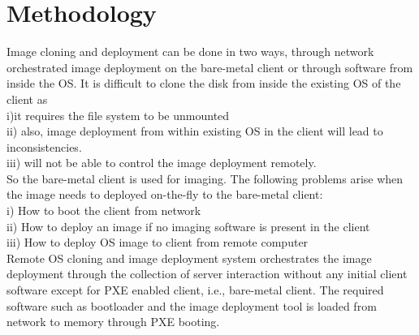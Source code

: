 \documentclass[a4paper,12pt]{article}
\begin{document}


\newpage

\section{\fontsize{16pt}{1em} Methodology}
Image cloning and deployment can be done in two ways, through network orchestrated image deployment on the bare-metal client or through software from inside the OS. It is difficult to clone the disk from inside the existing  OS of the client as \\
i)it requires the file system to be unmounted \\
ii) also, image deployment from within existing OS in the client will lead to inconsistencies. \\
iii) will not be able to control the image deployment remotely.\\
So the bare-metal client is used for imaging. The following problems arise when the image needs to  deployed on-the-fly to the bare-metal client:\\
i) How to boot the client from network \\
ii) How to deploy an image if no imaging software is present in the client \\
iii) How to deploy OS image to client from remote computer \\
Remote OS cloning and image deployment system orchestrates the image deployment through the collection of server interaction without any initial client software except for PXE enabled client, i.e., bare-metal client. The required software such as bootloader and the image deployment tool is loaded from network to memory through PXE booting.
\end{document}
